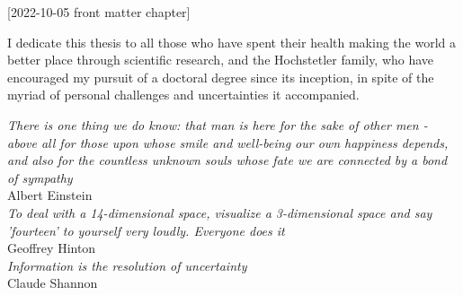 [2022-10-05 front matter chapter]
%
%
%
%
%
%

%
%
%
\begin{statement}
\end{statement}

\begin{dedication}
I dedicate this thesis to all those who have spent their health making the world a better place through scientific research, and the Hochstetler family, who have encouraged my pursuit of a doctoral degree since its inception, in spite of the myriad of personal challenges and uncertainties it accompanied.  

\vspace{1in}
\textit{There is one thing we do know: that man is here for the sake of other men - above all for those upon whose smile and well-being our own happiness depends, and also for the countless unknown souls whose fate we are connected by a bond of sympathy}\\
Albert Einstein\\
\vspace{1in}
\textit{To deal with a 14-dimensional space, visualize a 3-dimensional space and say 'fourteen' to yourself very loudly. Everyone does it}\\ Geoffrey Hinton \\
\vspace{1in}
\textit{Information is the resolution of uncertainty} \\Claude Shannon
\vspace{1in}



\end{dedication}

